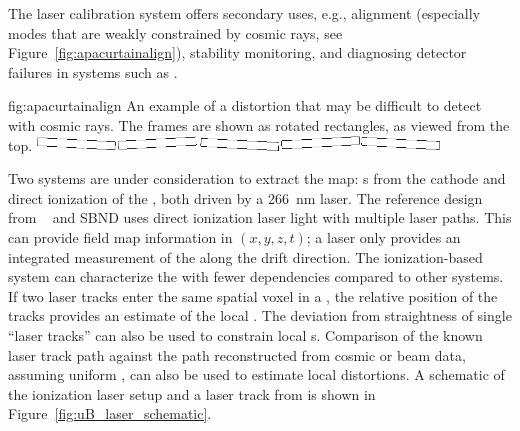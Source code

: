 The laser calibration system offers secondary uses, e.g., alignment (especially modes that are weakly constrained by cosmic rays, see Figure~\ref{fig:apacurtainalign}), stability monitoring, and diagnosing detector failures in systems such as .  

\begin{dunefigure}{fig:apacurtainalign}
{An example of a distortion that may be difficult to detect with cosmic rays.  The  frames are shown as rotated rectangles, as viewed from the top.}
\includegraphics[width=0.8\textwidth]{graphics/apacurtainalign.png}
\end{dunefigure}

Two systems are under consideration to extract the \efield map: \phel{}s from the \lartpc cathode and direct ionization of the , both driven by a \SI{266}{\nano\m} laser.  The reference design from ~\cite{bib:uBlaser2019} and SBND uses direct ionization laser light with multiple laser paths. This can provide field map information in $(x, y, z, t)$; a \phel laser only provides an integrated measurement of the \efield along the drift direction.
The ionization-based system can characterize the \efield with fewer dependencies compared to other systems. If two laser tracks enter the same spatial voxel in a , the relative position of the tracks provides an estimate of the local \threed \efield. The deviation from straightness of single ``laser tracks'' can also be used to constrain local \efield{}s. Comparison of the known laser track path against the path reconstructed from cosmic or beam data, assuming uniform \efield, can also be used to estimate local \efield distortions. A schematic of the ionization laser setup and a laser track from  is shown in Figure~\ref{fig:uB_laser_schematic}.


